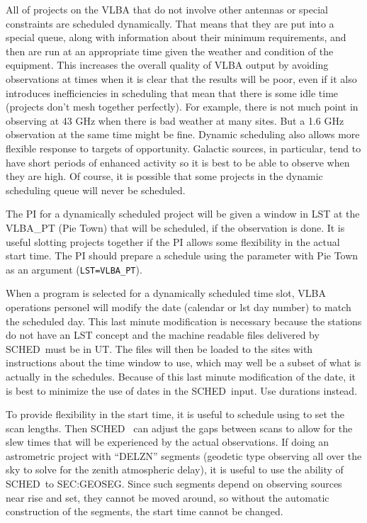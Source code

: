 \documentclass{report}
\newcommand{\schedb}{{\sc SCHED~}}
\begin{document}
All of projects on the VLBA that do not involve other antennas or special
constraints are scheduled dynamically.
That means that they are put into a special queue, along with information
about their minimum requirements, and then are run at an appropriate
time given the weather and condition of the equipment.  This
increases the overall quality of VLBA output by avoiding observations
at times when it is clear that the results will be poor, even if it
also introduces inefficiencies in scheduling that mean that there is
some idle time (projects don't mesh together perfectly).  For example,
there is not much point in observing at 43 GHz when there is bad weather
at many sites.  But a 1.6 GHz observation at the same time might be fine.
Dynamic scheduling also allows more flexible response to targets of
opportunity.  Galactic sources, in particular, tend to have short
periods of enhanced activity so it is best to be able to observe when
they are high.  Of course, it is possible that some projects in the
dynamic scheduling queue will never be scheduled.

The PI for a dynamically scheduled project will be given a window in
LST at the VLBA\_PT (Pie Town) that will be scheduled, if the
observation is done.  It is useful slotting projects together if the
PI allows some flexibility in the actual start time.  The PI should
prepare a schedule using the  parameter with Pie
Town as an argument ({\tt LST=VLBA\_PT}).

When a program is selected for a dynamically scheduled time slot,
VLBA operations personel will modify the date (calendar or lst day
number) to match the scheduled day.  This last minute modification
is necessary because the stations do not have an LST concept and
the machine readable files delivered by \schedb must be in UT.
The files will then be loaded to the sites with instructions about
the time window to use, which may well be a subset of what is
actually in the schedules.  Because of this last minute modification
of the date, it is best to minimize the use of dates in the
\schedb input.  Use durations instead.

To provide flexibility in the start time, it is useful to schedule
using  to set the scan lengths.  Then \schedb
can adjust the gaps between scans to allow for the slew times that
will be experienced by the actual observations.  If doing an
astrometric project with ``DELZN'' segments (geodetic type observing
all over the sky to solve for the zenith atmospheric delay), it is
useful to use the ability of \schedb to  {SEC:GEOSEG}.  Since such segments depend on
observing sources near rise and set, they cannot be moved around, so
without the automatic construction of the segments, the start time
cannot be changed.
\end{document}
